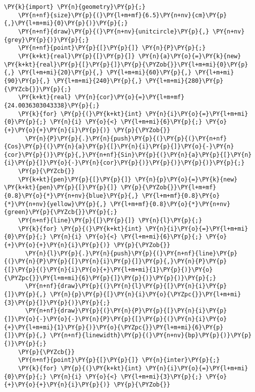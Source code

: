\begin{Verbatim}[commandchars=\\\{\}]
    \PY{k}{import} \PY{n}{geometry}\PY{p}{;}
    \PY{n+nf}{size}\PY{p}{(}\PY{l+m+mf}{6.5}\PY{n+nv}{cm}\PY{p}{,}\PY{l+m+mi}{0}\PY{p}{)}\PY{p}{;}
    \PY{n+nf}{draw}\PY{p}{(}\PY{n+nv}{unitcircle}\PY{p}{,} \PY{n+nv}{grey}\PY{p}{)}\PY{p}{;}
    \PY{n+nf}{point}\PY{p}{[}\PY{p}{]} \PY{n}{P}\PY{p}{;}
    \PY{k+kt}{real}\PY{p}{[}\PY{p}{]} \PY{n}{a}\PY{o}{=}\PY{k}{new} \PY{k+kt}{real}\PY{p}{[}\PY{p}{]}\PY{p}{\PYZob{}}\PY{l+m+mi}{0}\PY{p}{,} \PY{l+m+mi}{20}\PY{p}{,} \PY{l+m+mi}{60}\PY{p}{,} \PY{l+m+mi}{90}\PY{p}{,} \PY{l+m+mi}{240}\PY{p}{,} \PY{l+m+mi}{280}\PY{p}{\PYZcb{}}\PY{p}{;}
    \PY{k+kt}{real} \PY{n}{cor}\PY{o}{=}\PY{l+m+mf}{24.0036303043338}\PY{p}{;}
    \PY{k}{for} \PY{p}{(}\PY{k+kt}{int} \PY{n}{i}\PY{o}{=}\PY{l+m+mi}{0}\PY{p}{;} \PY{n}{i} \PY{o}{<} \PY{l+m+mi}{6}\PY{p}{;} \PY{o}{+}\PY{o}{+}\PY{n}{i}\PY{p}{)} \PY{p}{\PYZob{}}
      \PY{n}{P}\PY{p}{.}\PY{n}{push}\PY{p}{(}\PY{p}{(}\PY{n+nf}{Cos}\PY{p}{(}\PY{n}{a}\PY{p}{[}\PY{n}{i}\PY{p}{]}\PY{o}{-}\PY{n}{cor}\PY{p}{)}\PY{p}{,}\PY{n+nf}{Sin}\PY{p}{(}\PY{n}{a}\PY{p}{[}\PY{n}{i}\PY{p}{]}\PY{o}{-}\PY{n}{cor}\PY{p}{)}\PY{p}{)}\PY{p}{)}\PY{p}{;}
    \PY{p}{\PYZcb{}}
    \PY{k+kt}{pen}\PY{p}{[}\PY{p}{]} \PY{n}{p}\PY{o}{=}\PY{k}{new} \PY{k+kt}{pen}\PY{p}{[}\PY{p}{]} \PY{p}{\PYZob{}}\PY{l+m+mf}{0.8}\PY{o}{*}\PY{n+nv}{blue}\PY{p}{,} \PY{l+m+mf}{0.8}\PY{o}{*}\PY{n+nv}{yellow}\PY{p}{,} \PY{l+m+mf}{0.8}\PY{o}{*}\PY{n+nv}{green}\PY{p}{\PYZcb{}}\PY{p}{;}
    \PY{n+nf}{line}\PY{p}{[}\PY{p}{]} \PY{n}{l}\PY{p}{;}
    \PY{k}{for} \PY{p}{(}\PY{k+kt}{int} \PY{n}{i}\PY{o}{=}\PY{l+m+mi}{0}\PY{p}{;} \PY{n}{i} \PY{o}{<} \PY{l+m+mi}{6}\PY{p}{;} \PY{o}{+}\PY{o}{+}\PY{n}{i}\PY{p}{)} \PY{p}{\PYZob{}}
      \PY{n}{l}\PY{p}{.}\PY{n}{push}\PY{p}{(}\PY{n+nf}{line}\PY{p}{(}\PY{n}{P}\PY{p}{[}\PY{n}{i}\PY{p}{]}\PY{p}{,}\PY{n}{P}\PY{p}{[}\PY{p}{(}\PY{n}{i}\PY{o}{+}\PY{l+m+mi}{1}\PY{p}{)}\PY{o}{\PYZpc{}}\PY{l+m+mi}{6}\PY{p}{]}\PY{p}{)}\PY{p}{)}\PY{p}{;}
      \PY{n+nf}{draw}\PY{p}{(}\PY{n}{l}\PY{p}{[}\PY{n}{i}\PY{p}{]}\PY{p}{,} \PY{n}{p}\PY{p}{[}\PY{n}{i}\PY{o}{\PYZpc{}}\PY{l+m+mi}{3}\PY{p}{]}\PY{p}{)}\PY{p}{;}
      \PY{n+nf}{draw}\PY{p}{(}\PY{n}{P}\PY{p}{[}\PY{n}{i}\PY{p}{]}\PY{o}{-}\PY{o}{-}\PY{n}{P}\PY{p}{[}\PY{p}{(}\PY{n}{i}\PY{o}{+}\PY{l+m+mi}{1}\PY{p}{)}\PY{o}{\PYZpc{}}\PY{l+m+mi}{6}\PY{p}{]}\PY{p}{,} \PY{n+nf}{linewidth}\PY{p}{(}\PY{n+nv}{bp}\PY{p}{)}\PY{p}{)}\PY{p}{;}
    \PY{p}{\PYZcb{}}
    \PY{n+nf}{point}\PY{p}{[}\PY{p}{]} \PY{n}{inter}\PY{p}{;}
    \PY{k}{for} \PY{p}{(}\PY{k+kt}{int} \PY{n}{i}\PY{o}{=}\PY{l+m+mi}{0}\PY{p}{;} \PY{n}{i} \PY{o}{<} \PY{l+m+mi}{3}\PY{p}{;} \PY{o}{+}\PY{o}{+}\PY{n}{i}\PY{p}{)} \PY{p}{\PYZob{}}

\end{Verbatim}
